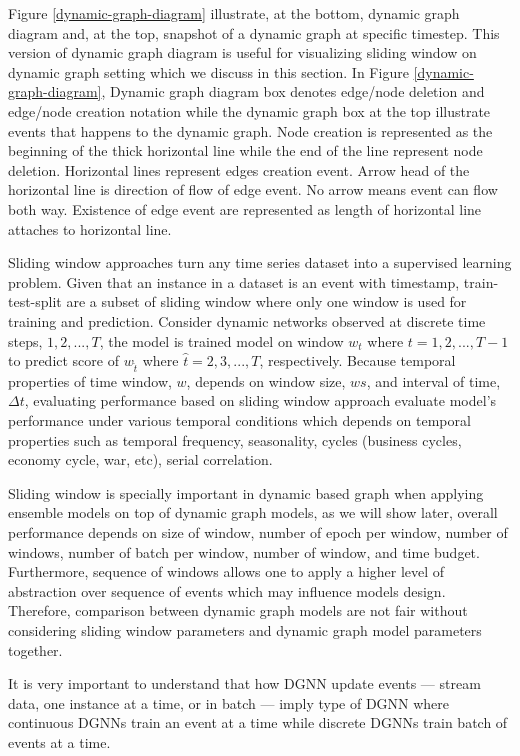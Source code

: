 \documentclass{IEEEtran}
\begin{document}
Figure \ref{dynamic-graph-diagram} illustrate, at the bottom, dynamic graph diagram and, at the top, snapshot of a dynamic graph at specific timestep. This version of dynamic graph diagram is useful for visualizing sliding window on dynamic graph setting which we discuss in this section. In Figure \ref{dynamic-graph-diagram}, Dynamic graph diagram box denotes edge/node deletion and edge/node creation notation while the dynamic graph box at the top illustrate events that happens to the dynamic graph. Node creation is represented as the beginning of the thick horizontal line while the end of the line represent node deletion. Horizontal lines represent edges creation event. Arrow head of the horizontal line is direction of flow of edge event. No arrow means event can flow both way. Existence of edge event are represented as length of horizontal line attaches to horizontal line.

Sliding window approaches turn any time series dataset into a supervised learning problem. Given that an instance in a dataset is an event with timestamp, train-test-split are a subset of sliding window where only one window is used for training and prediction. Consider dynamic networks observed at discrete time steps, \(1,2,...,T\), the model is trained model on window \(w_{t}\) where \(t=1,2,...,T-1\) to predict score of \(w_{\hat t}\) where \(\hat t=2,3,...,T\), respectively. Because temporal properties of time window, \(w\), depends on window size, \(ws\), and interval of time, \(\Delta t\), evaluating performance based on sliding window approach evaluate model's performance under various temporal conditions which depends on temporal properties such as temporal frequency, seasonality, cycles (business cycles, economy cycle, war, etc), serial correlation.

Sliding window is specially important in dynamic based graph when applying ensemble models on top of dynamic graph models, as we will show later, overall performance depends on size of window, number of epoch per window, number of windows, number of batch per window, number of window, and time budget. Furthermore, sequence of windows allows one to apply a higher level of abstraction over sequence of events which may influence models design. Therefore, comparison between dynamic graph models are not fair without considering sliding window parameters and dynamic graph model parameters together.

It is very important to understand that how DGNN update events --- stream data, one instance at a time, or in batch --- imply type of DGNN where continuous DGNNs train an event at a time while discrete DGNNs train batch of events at a time.
\end{document}
